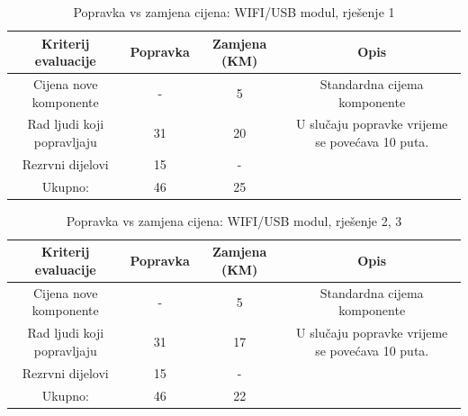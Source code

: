 \documentclass[12pt]{article}
\begin{document}
\begin{landscape}
\vspace*{\fill}
\begin{table}[htbp]
  \centering
  \footnotesize
  \caption{Popravka vs zamjena cijena: WIFI/USB modul, rješenje 1}
    \begin{tabular}{cccc}
    \toprule
    Kriterij evaluacije & Popravka & Zamjena (KM) & Opis \\
    \midrule
     Cijena nove komponente & -     & 5     & \multicolumn{1}{p{19.57em}}{Standardna \newline{}cijema\newline{} komponente} \\
    \midrule
    Rad ljudi koji popravljaju & 31    & 20    & \multicolumn{1}{p{19.57em}}{ U slučaju popravke vrijeme se povećava 10 puta. } \\
    \midrule
    Rezrvni dijelovi & 15    & -     &  \\
    \midrule
    Ukupno: & 46    & 25    &  \\
    \bottomrule
    \end{tabular}%
  \label{tab:popravka12}%
\end{table}%

\begin{table}[htbp]
  \centering
  \footnotesize
  \caption{Popravka vs zamjena cijena: WIFI/USB modul, rješenje 2, 3}
    \begin{tabular}{cccc}
    \toprule
    Kriterij evaluacije & Popravka & Zamjena (KM) & Opis \\
    \midrule
     Cijena nove komponente & -     & 5     & \multicolumn{1}{p{23.215em}}{Standardna \newline{}cijema\newline{} komponente} \\
    \midrule
    Rad ljudi koji popravljaju & 31    & 17    & \multicolumn{1}{p{23.215em}}{ U slučaju popravke vrijeme se povećava 10 puta. } \\
    \midrule
    Rezrvni dijelovi & 15    & -     &  \\
    \midrule
    Ukupno: & 46    & 22    &  \\
    \bottomrule
    \end{tabular}%
  \label{tab:popravka13}%
\end{table}%

\vspace*{\fill}
\end{landscape}
\end{document}
